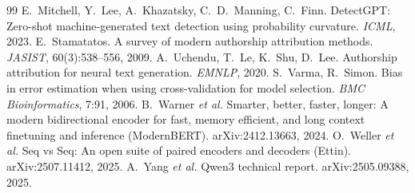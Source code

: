 \documentclass[10pt,twocolumn,letterpaper]{article}
\begin{document}
\begin{thebibliography}{99}
 E.~Mitchell, Y.~Lee, A.~Khazatsky, C.~D.~Manning, C.~Finn. DetectGPT: Zero-shot machine-generated text detection using probability curvature. \emph{ICML}, 2023.
 E.~Stamatatos. A survey of modern authorship attribution methods. \emph{JASIST}, 60(3):538--556, 2009.
 A.~Uchendu, T.~Le, K.~Shu, D.~Lee. Authorship attribution for neural text generation. \emph{EMNLP}, 2020.
 S.~Varma, R.~Simon. Bias in error estimation when using cross-validation for model selection. \emph{BMC Bioinformatics}, 7:91, 2006.
 B.~Warner \emph{et al.} Smarter, better, faster, longer: A modern bidirectional encoder for fast, memory efficient, and long context finetuning and inference (ModernBERT). arXiv:2412.13663, 2024.
 O.~Weller \emph{et al.} Seq vs Seq: An open suite of paired encoders and decoders (Ettin). arXiv:2507.11412, 2025.
 A.~Yang \emph{et al.} Qwen3 technical report. arXiv:2505.09388, 2025.
\end{thebibliography}
\end{document}
